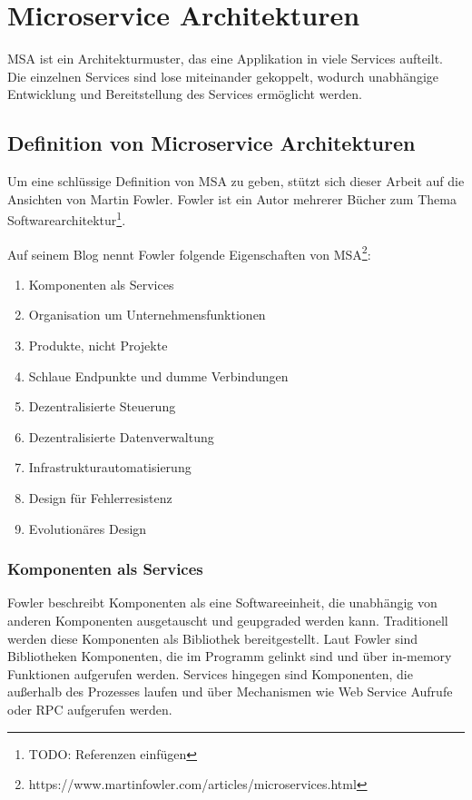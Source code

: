 \newpage
\section{Microservice Architekturen} \label{msa}


MSA ist ein Architekturmuster, das eine Applikation in viele Services aufteilt.
Die einzelnen Services sind lose miteinander gekoppelt, wodurch unabhängige
Entwicklung und Bereitstellung des Services ermöglicht werden.

\subsection{Definition von Microservice Architekturen}

Um eine schlüssige Definition von MSA zu geben, stützt sich dieser Arbeit auf
die Ansichten von Martin Fowler. Fowler ist ein Autor mehrerer Bücher zum
Thema Softwarearchitektur\footnote{TODO: Referenzen einfügen}.

Auf seinem Blog nennt Fowler folgende Eigenschaften von
MSA\footnote{https://www.martinfowler.com/articles/microservices.html}:

\begin{enumerate}
  \item Komponenten als Services
  \item Organisation um Unternehmensfunktionen
  \item Produkte, nicht Projekte
  \item Schlaue Endpunkte und dumme Verbindungen
  \item Dezentralisierte Steuerung
  \item Dezentralisierte Datenverwaltung
  \item Infrastrukturautomatisierung
  \item Design für Fehlerresistenz
  \item Evolutionäres Design
\end{enumerate}

\subsubsection{Komponenten als Services}

Fowler beschreibt Komponenten als eine Softwareeinheit, die unabhängig von
anderen Komponenten ausgetauscht und geupgraded werden kann. Traditionell werden
diese Komponenten als Bibliothek bereitgestellt. Laut Fowler sind Bibliotheken
Komponenten, die im Programm gelinkt sind und über in-memory Funktionen
aufgerufen werden. Services hingegen sind Komponenten, die außerhalb des
Prozesses laufen und über Mechanismen wie Web Service Aufrufe oder \ac{RPC}
aufgerufen werden.

